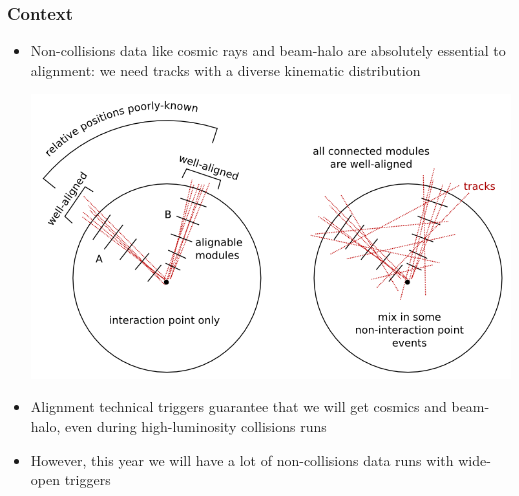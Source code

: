 \documentclass[compress]{beamer}
\begin{document}

\begin{frame}
\frametitle{Context}
\small

\begin{itemize}\setlength{\itemsep}{0.25 cm}
\item Non-collisions data like cosmic rays and beam-halo are
  absolutely essential to alignment: we need tracks with a diverse
  kinematic distribution

\begin{center}
\includegraphics[width=0.7\linewidth]{why_non-collisions_are_important.png}
\end{center}

\item Alignment technical triggers guarantee that we will get cosmics
  and beam-halo, even during high-luminosity collisions runs

\item However, this year we will have a lot of non-collisions data runs with
  wide-open triggers
\end{itemize}
\end{frame}
\end{document}
